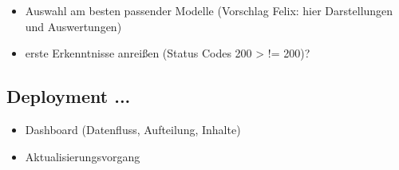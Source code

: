 \begin{itemize}
    \item Auswahl am besten passender Modelle (Vorschlag Felix: hier Darstellungen und Auswertungen)
    \item erste Erkenntnisse anreißen (Status Codes 200 > != 200)?
\end{itemize}

\subsection{Deployment ...}\label{subsec:deployment}
\begin{itemize}
    \item Dashboard (Datenfluss, Aufteilung, Inhalte)
    \item Aktualisierungsvorgang
\end{itemize}
